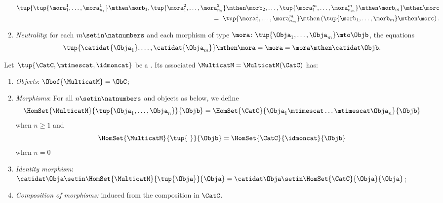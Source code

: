 \begin{ctdefinition}[Multicategory]
\begin{enumerate}
              \begin{equation}
                  \begin{aligned}
                      \tup{ \tup{\mora_{1}^1,\ldots, \mora_{n_1}^1} \mthen \morb_1, \tup{\mora_{1}^2,\ldots, \mora_{n_2}^2 }\mthen \morb_2,\ldots, \tup{ \mora_{1}^m,\ldots, \mora_{n_m}^m } \mthen \morb_m } \mthen \morc \\ = \ \tup{ \mora_{1}^1,\ldots, \mora_{n_m}^m } \mthen \left ( \tup{ \morb_{1},\ldots, \morb_{m} } \mthen \morc \right ).
                  \end{aligned}
              \end{equation}
        \item \emph{Neutrality}: for each $m \setin \natnumbers$ and each morphism of type $\mora \colon \tup{\Obja_1,\ldots,\Obja_m}\mto \Objb$, the equations
              \begin{equation}
                  \tup{\catidat{\Obja_1},\ldots, \catidat{\Obja_m}}
                  \mthen \mora = \mora = \mora \mthen \catidat\Objb.
              \end{equation}
    \end{enumerate}
\end{ctdefinition}

\begin{ctdefinition}
    \label{def:multicat_from_monoidal}
    Let~$\tup{\CatC, \mtimescat, \idmoncat}$ be a .
    Its associated  $\MulticatM = \MulticatM(\CatC)$ has:
    \begin{enumerate}
        \item \emph{Objects}: $\Obof{\MulticatM}=\ObC$;
        \item \emph{Morphisms}: For all $n \setin \natnumbers$ and objects as below, we define
              $$\HomSet{\MulticatM}{\tup{\Obja_1,\ldots,\Obja_n}}{\Objb}=\HomSet{\CatC}{\Obja_1 \mtimescat \ldots \mtimescat \Obja_n}{\Objb}$$ when $n \geq 1$ and
              $$\HomSet{\MulticatM}{\tup{ \ }}{\Objb} = \HomSet{\CatC}{\idmoncat}{\Objb} $$
              when $n=0$
        \item \emph{Identity morphism}: $\catidat\Obja \setin \HomSet{\MulticatM}{\tup{\Obja}}{\Obja}=\catidat\Obja \setin \HomSet{\CatC}{\Obja}{\Obja}$;
        \item \emph{Composition of morphisms:} induced from the composition in $\CatC$.
    \end{enumerate}
\end{ctdefinition}

